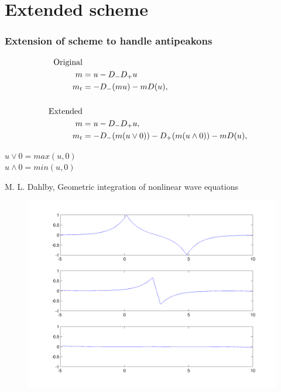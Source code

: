 \documentclass{beamer}
\begin{document}
\section*{Extended scheme}
\begin{frame}
\frametitle{Extension of scheme to handle antipeakons}
\begin{align*}
\text{Original} \\
m &= u - D_- D_+ u \notag \\
m_t &=- D_- ( m u ) - m D ( u ), \\ \\
\text{Extended} \\
m &= u - D_{-}D_{+}u, \notag \\ 
m_t &= -D_{-}(m(u \vee 0)) -D_{+}(m(u \wedge 0)) - mD(u), 
\end{align*}

$u \vee 0 = max(u, 0)$ \\
$u \wedge 0 = min(u, 0) $

\vspace{1cm}
\tiny{M. L. Dahlby, Geometric integration of nonlinear
wave equations}
\end{frame}


\begin{frame}
\begin{figure}
\includegraphics[width=0.8\linewidth]{gfx/peakonvanishes}
\end{figure}
\end{frame}
\end{document}
